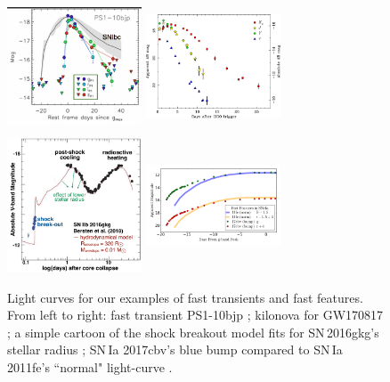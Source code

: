 \documentclass[12pt, letterpaper]{article}
\begin{document}
\begin{center}
\begin{figure}[!h]
\includegraphics[width=4cm,height=4cm]{figures/Drout_PS1-10bjp.png}
\includegraphics[width=4cm,height=4cm]{figures/Tanvir_fig2.jpg}
\includegraphics[width=4cm,height=4cm]{figures/2016gkg.pdf}
\includegraphics[width=4cm,height=4cm]{figures/bluebump.png}
\caption{{\footnotesize Light curves for our examples of fast transients and fast features. From left to right: fast transient PS1-10bjp \citep{2014ApJ...794...23D}; kilonova for GW170817 \citep{2017ApJ...848L..27T}; a simple cartoon of the shock breakout model fits for SN\,2016gkg's stellar radius \citep{2018Natur.554..497B}; SN\,Ia 2017cbv's blue bump compared to SN\,Ia 2011fe's ``normal" light-curve \citep{2017ApJ...845L..11H,2015MNRAS.446.2073G}. }}
\end{figure}
\end{center}
\end{document}
